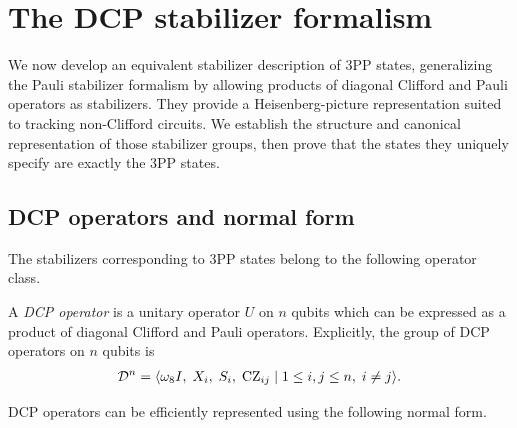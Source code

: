 \section{The DCP stabilizer formalism}
\label{sec:dcp-stabilizer-formalism}

We now develop an equivalent stabilizer description of 3PP states, generalizing the Pauli stabilizer formalism by allowing products of diagonal Clifford and Pauli operators as stabilizers. They provide a Heisenberg-picture representation suited to tracking non-Clifford circuits. We establish the structure and canonical representation of those stabilizer groups, then prove that the states they uniquely specify are exactly the 3PP states.

\subsection{DCP operators and normal form}

The stabilizers corresponding to 3PP states belong to the following operator class.

\begin{definition}\label{def:dcp}
    A \textit{DCP operator} is a unitary operator $U$ on $n$ qubits which can be expressed as a product of diagonal Clifford and Pauli operators. Explicitly, the group of DCP
    operators on $n$ qubits is
    \begin{align}
        \mathcal{D}^n
        = \langle \omega_8 I,\; X_i,\; S_i,\; \operatorname{CZ}_{ij}
        \mid 1\leq i,j\leq n,\; i \neq j \rangle.
    \end{align}
\end{definition}

DCP operators can be efficiently represented using the following normal form.

\newcommand{\dcpNormalFormStatement}{%
Every DCP operator $U$ on $n$ qubits corresponds to a unique quadruple $(k,\vec{s},M,\vec{x})$ where $k \in \Z_8, \vec{s} \in \Z_4^{n}, \vec{x} \in \F_2^n$, and $M$ is an $n\times n$ symmetric matrix over $\F_2$ that is zero on the diagonal, such that
\begin{align}
    U = \omega_8^{k}\, D(\vec{s},M)\, X(\vec{x}),
\end{align}
where $D(\vec{s},M)$ is the diagonal Clifford operator defined by
\begin{align}
    D(\vec{s},M) = \S^{s_1} \otimes \cdots \otimes \S^{s_n} \; \cdot \; \prod_{1\le i < j \le n} \CZ_{ij}^{M_{ij}},
\end{align}
and $X(\vec{x})$ is the Pauli operator defined by
\begin{align}
    X(\vec{x}) = X^{x_1} \otimes \cdots \otimes X^{x_n}.
\end{align}
}

